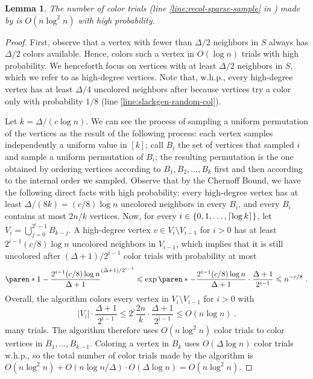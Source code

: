 \documentclass[a4paper,english,11pt]{amsart}
\newtheorem{lemma}{Lemma}[section]
\theoremstyle{definition}
\renewcommand{\leq}{\leqslant}
\DeclarePairedDelimiter{\paren}()
\DeclarePairedDelimiter{\ceil}{\lceil}{\rceil}
\DeclarePairedDelimiter{\set}{\{}{\}}
\newcommand{\whp}{$\text{w.h.p.}$\xspace}
\begin{document}
\begin{lemma}
    The number of color trials (line \ref{line:recol-sparse-sample} in \RecolorSparse) made by \FreshColoring is $O(n\log^2 n)$ with high probability.
\end{lemma}
\begin{proof}
    First, observe that a vertex with fewer than $\Delta/2$ neighbors in $S$ always has $\Delta/2$ colors available. Hence, \RecolorSparse colors such a vertex in $O(\log n)$ trials with high probability. We henceforth focus on vertices with at least $\Delta/2$ neighbors in $S$, which we refer to as high-degree vertices. Note that, \whp, every high-degree vertex has at least $\Delta/4$ uncolored neighbors after \OneShotColoring because vertices try a color only with probability $1/8$ (line \ref{line:slackgen-random-col}).

    Let $k = \Delta/(c\log n)$. We can see the process of sampling a uniform permutation of the vertices as the result of the following process: each vertex samples independently a uniform value in $[k]$; call $B_i$ the set of vertices that sampled $i$ and sample a uniform permutation of $B_i$; the resulting permutation is the one obtained by ordering vertices according to $B_1, B_2, \ldots, B_k$ first and then according to the internal order we sampled. Observe that by the Chernoff Bound, we have the following direct facts with high probability: every high-degree vertex has at least $\Delta/(8k) = (c/8)\log n$ uncolored neighbors in every $B_i$, and every $B_i$ contains at most $2n/k$ vertices. Now, for every $i\in \set{0,1,\ldots,\ceil{ \log k }}$, let $V_i = \bigcup_{j = 0}^{2^i - 1} B_{k-j}$. A high-degree vertex $v \in V_i \setminus V_{i-1}$ for $i>0$ has at least $2^{i-1}(c/8)\log n$ uncolored neighbors in $V_{i-1}$, which implies that it is still uncolored after $(\Delta + 1)/2^{i-1}$ color trials with probability at most
    \[
    \paren*{ 1 - \frac{2^{i-1} (c/8)\log n}{\Delta+1} }^{(\Delta + 1)/2^{i-1}}
    \leq \exp\paren*{ -\frac{2^{i-1} (c/8)\log n}{\Delta+1} \cdot \frac{\Delta + 1}{2^{i-1}} } \leq n^{-c/8} \ .
    \]
    Overall, the algorithm colors every vertex in $V_i \setminus V_{i-1}$ for $i > 0$ with
    \[
    |V_i| \cdot \frac{\Delta+1}{2^{i-1}}
    \leq 2^i \frac{2n}{k} \cdot \frac{\Delta+1}{2^{i-1}}
    \leq O(n\log n) \ .
    \]
    many trials.
    The algorithm therefore uses $O(n\log^2 n)$ color trials to color vertices in $B_1, \ldots, B_{k-1}$. Coloring a vertex in $B_k$ uses $O(\Delta\log n)$ color trials \whp, so the total number of color trials made by the algorithm is $O(n\log^2 n) + O(n\log n/\Delta) \cdot O(\Delta\log n) = O(n\log^2 n)$.
\end{proof}
\end{document}
